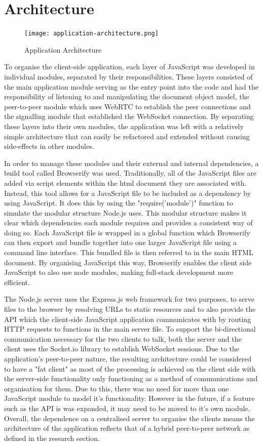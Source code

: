 \documentclass[]{report}
\begin{document}
		\section{Architecture}
			\begin{figure}[H]
				\caption{Application Architecture}
				\centering
				\texttt{[image: application-architecture.png]}
			\end{figure}
			To organise the client-side application, each layer of JavaScript was developed in individual modules, separated by their responsibilities. These layers consisted of the main application module serving as the entry point into the code and had the responsibility of listening to and manipulating the document object model, the peer-to-peer module which uses WebRTC to establish the peer connections and the signalling module that established the WebSocket connection. By separating these layers into their own modules, the application was left with a relatively simple architecture that can easily be refactored and extended without causing side-effects in other modules.
			
			In order to manage these modules and their external and internal dependencies, a build tool called Browserify was used. Traditionally, all of the JavaScript files are added via script elements within the html document they are associated with. Instead, this tool allows for a JavaScript file to be included as a dependency by using JavaScript. It does this by using the "require('module')" function to simulate the modular structure Node.js uses. This modular structure makes it clear which dependencies each module requires and provides a consistent way of doing so. Each JavaScript file is wrapped in a global function which Browserify can then export and bundle together into one larger JavaScript file using a command line interface. This bundled file is then referred to in the main HTML document. By organising JavaScript this way, Browserify enables the client side JavaScript to also use node modules, making full-stack development more efficient.
			
			The Node.js server uses the Express.js web framework for two purposes, to serve files to the browser by resolving URLs to static resources and to also provide the API which the client-side JavaScript application communicates with by routing HTTP requests to functions in the main server file. To support the bi-directional communication necessary for the two clients to talk, both the server and the client uses the Socket.io library to establish WebSocket sessions. Due to the application's peer-to-peer nature, the resulting architecture could be considered to have a "fat client" as most of the processing is achieved on the client side with the server-side functionality only functioning as a method of communications and organisation for them. Due to this, there was no need for more than one JavaScript module to model it's functionality. However in the future, if a feature such as the API is was expanded, it may need to be moved to it's own module. Overall, the dependence on a centralised server to organise the clients means the architecture of the application reflects that of a hybrid peer-to-peer network as defined in the research section.
				
\end{document}
